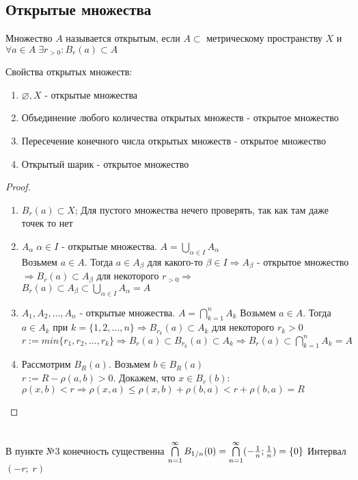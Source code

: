 \subsection{Открытые множества}
\begin{conj}
    Множество $A$ называется открытым, если $A \subset $ метрическому пространству $X$ и $\forall a \in A \; \exists r_{>0} : B_r(a) \subset A$
\end{conj}
\begin{theorem-non}
    Свойства открытых множеств:
    \begin{enumerate}
        \item $\varnothing, X$ - открытые множества 
        \item Объединение любого количества открытых множеств - открытое множество
        \item Пересечение конечного числа открытых множеств - открытое множество
        \item Открытый шарик - открытое множество
    \end{enumerate}
    \begin{proof}
        \quad \\
        \begin{enumerate}
            \item $B_r(a) \subset X$; Для пустого множества нечего проверять, так как там даже точек то нет
            \item $A_{\alpha} \; \alpha \in I$ - открытые множества. $A = \bigcup\limits_{\alpha \in I} A_{\alpha}$ \\
            Возьмем $a \in A$. Тогда $a \in A_{\beta}$ для какого-то $\beta \in I \Longrightarrow A_{\beta}$ - открытое множество 
            $\Longrightarrow B_r(a) \subset A_{\beta}$ для некоторого $r_{>0} \Longrightarrow$ \\
            $B_r(a) \subset A_{\beta} \subset \bigcup\limits_{\alpha \in I} A_{\alpha} = A$
            \item $A_1, A_2, \dots , A_n$ - открытые множества. $A = \bigcap\limits_{k = 1}^{n} A_k$
            Возьмем $a \in A$. Тогда $a \in A_k$ при $k = \{1, 2, \dots , n\} \Longrightarrow
            B_{r_k}(a) \subset A_k$ для некоторого $r_k > 0$ \\
            $r := min\{r_1, r_2, \dots , r_k\} \Longrightarrow B_r(a) \subset B_{r_k}(a) \subset A_k 
            \Longrightarrow B_r(a) \subset \bigcap\limits_{k=1}^n A_k = A$
            \item Рассмотрим $B_R(a)$. Возьмем $b \in B_R(a)$ \\
            $r := R-\rho(a, b) > 0$.
            Докажем, что $x \in B_r(b):$ \\
            $\rho(x, b) < r \Longrightarrow \rho(x,a) \leqslant \rho(x, b) + \rho(b,a) < r + \rho(b,a) = R$
        \end{enumerate}
    \end{proof}
    \notice \\
    В пункте №3 конечность существенна
    $\bigcap\limits_{n=1}^{\infty} B_{1/n}(0) = \bigcap\limits_{n=1}^{\infty}(-{{1}\over{n}}; {{1}\over{n}}) = \{0\}$ Интервал $(-r; \; r)$
\end{theorem-non}
